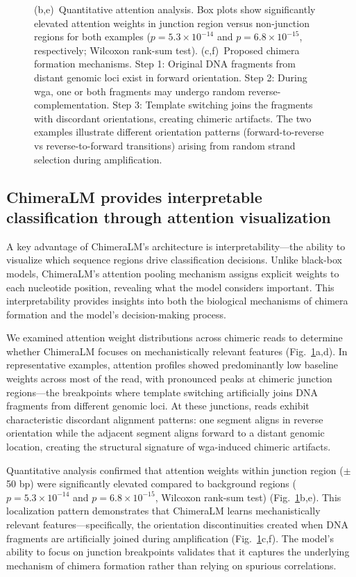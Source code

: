 \documentclass[pdflatex,sn-nature,lineno]{sn-jnl}%
\theoremstyle{thmstyleone}%
\theoremstyle{thmstyletwo}%
\theoremstyle{thmstylethree}%
\begin{document}
\begin{figure}[H]
{		(b,e)~Quantitative attention analysis. Box plots show significantly elevated attention weights in junction region versus non-junction regions for both examples ($p = 5.3 \times 10^{-14}$ and $p = 6.8 \times 10^{-15}$, respectively; Wilcoxon rank-sum test).
		(c,f)~Proposed chimera formation mechanisms. Step 1: Original DNA fragments from distant genomic loci exist in forward orientation. Step 2: During \gls{wga}, one or both fragments may undergo random reverse-complementation. Step 3: Template switching joins the fragments with discordant orientations, creating chimeric artifacts. The two examples illustrate different orientation patterns (forward-to-reverse vs reverse-to-forward transitions) arising from random strand selection during amplification.
	}\label{fig:figure4}
\end{figure}

\subsection*{ChimeraLM provides interpretable classification through attention visualization}

A key advantage of ChimeraLM's architecture is interpretability—the ability to visualize which sequence regions drive classification decisions.
Unlike black-box models, ChimeraLM's attention pooling mechanism assigns explicit weights to each nucleotide position, revealing what the model considers important.
This interpretability provides insights into both the biological mechanisms of chimera formation and the model's decision-making process.

We examined attention weight distributions across chimeric reads to determine whether ChimeraLM focuses on mechanistically relevant features (Fig.~\ref{fig:figure4}a,d).
In representative examples, attention profiles showed predominantly low baseline weights across most of the read, with pronounced peaks at chimeric junction regions—the breakpoints where template switching artificially joins DNA fragments from different genomic loci. 
At these junctions, reads exhibit characteristic discordant alignment patterns: one segment aligns in reverse orientation while the adjacent segment aligns forward to a distant genomic location, creating the structural signature of \gls{wga}-induced chimeric artifacts.

Quantitative analysis confirmed that attention weights within junction region ($\pm$50 bp) were significantly elevated compared to background regions ($p = 5.3 \times 10^{-14}$ and $p = 6.8 \times 10^{-15}$, Wilcoxon rank-sum test) (Fig.~\ref{fig:figure4}b,e).
This localization pattern demonstrates that ChimeraLM learns mechanistically relevant features—specifically, the orientation discontinuities created when DNA fragments are artificially joined during amplification (Fig.~\ref{fig:figure4}c,f). 
The model's ability to focus on junction breakpoints validates that it captures the underlying mechanism of chimera formation rather than relying on spurious correlations.
\end{document}
